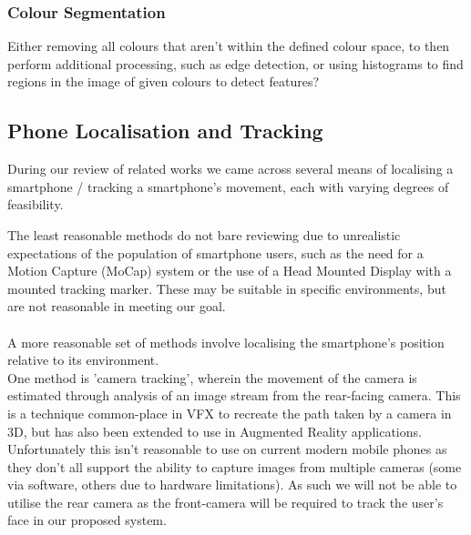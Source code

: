 \cite{yan2021fast}



\subsubsection{Colour Segmentation}\nl
Either removing all colours that aren't within the defined colour space, to then perform additional processing, such as edge detection, or using histograms to find regions in the image of given colours to detect features?


\subsection{Phone Localisation and Tracking}
During our review of related works we came across several means of localising a smartphone / tracking a smartphone's movement, each with varying degrees of feasibility.

The least reasonable methods do not bare reviewing due to unrealistic expectations of the population of smartphone users, such as the need for a Motion Capture (MoCap) system\cite{buschel2017investigating} or the use of a Head Mounted Display with a mounted tracking marker\cite{mohr2019trackcap}.
These may be suitable in specific environments, but are not reasonable in meeting our goal.
\\\\
A more reasonable set of methods involve localising the smartphone's position relative to its environment.
\\
One method is 'camera tracking', wherein the movement of the camera is estimated through analysis of an image stream from the rear-facing camera. This is a technique common-place in VFX to recreate the path taken by a camera in 3D\cite{barber2016camera}, but has also been extended to use in Augmented Reality applications\cite{jiang2000camera}.
Unfortunately this isn't reasonable to use on current modern mobile phones as they don't all support the ability to capture images from multiple cameras (some via software, others due to hardware limitations). As such we will not be able to utilise the rear camera as the front-camera will be required to track the user's face in our proposed system.

